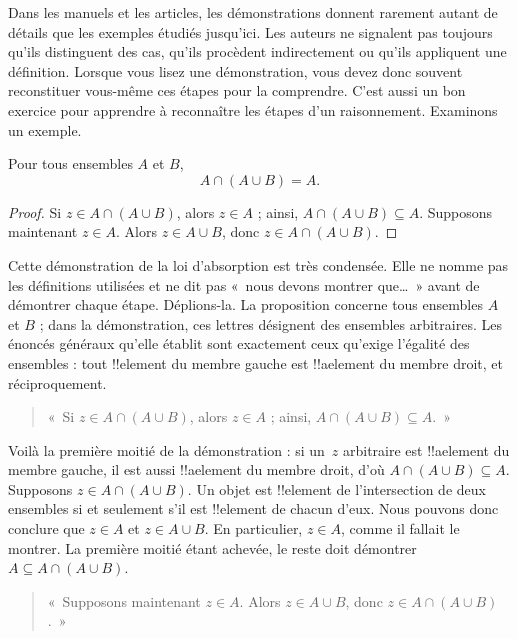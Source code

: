 \documentclass[../../../include/open-logic-section]{subfiles}
\begin{document}

Dans les manuels et les articles, les
démonstrations donnent rarement autant
de détails que les exemples étudiés
jusqu'ici. Les auteurs ne signalent
pas toujours qu'ils distinguent des
cas, qu'ils procèdent indirectement
ou qu'ils appliquent une définition.
Lorsque vous lisez une démonstration,
vous devez donc souvent reconstituer
vous-même ces étapes pour la comprendre.
C'est aussi un bon exercice pour apprendre à reconnaître les étapes
d'un raisonnement.
Examinons un exemple.

\begin{prop}[Absorption]
Pour tous ensembles $A$ et $B$,
\[
A \cap (A \cup B) = A.
\]
\end{prop}

\begin{proof}
Si $z \in A \cap (A \cup B)$,
alors $z \in A$ ; ainsi,
$A \cap (A \cup B) \subseteq A$.
Supposons maintenant $z \in A$.
Alors $z \in A \cup B$, donc
$z \in A \cap (A \cup B)$.
\end{proof}

Cette démonstration de la loi
d'absorption est très condensée.
Elle ne nomme pas les définitions
utilisées et ne dit pas «~nous
devons montrer que…~» avant de
démontrer chaque étape. Déplions-la.
La proposition concerne tous
ensembles $A$ et $B$ ; dans la
démonstration, ces lettres désignent
des ensembles arbitraires.
Les énoncés généraux qu'elle établit
sont exactement ceux qu'exige
l'égalité des ensembles : tout
!!{element} du membre gauche est
!!a{element} du membre droit,
et réciproquement.

\begin{quote}
«~Si $z \in A \cap (A \cup B)$,
alors $z \in A$ ; ainsi,
$A \cap (A \cup B) \subseteq A$.~»
\end{quote}

Voilà la première moitié de la
démonstration : si un~$z$ arbitraire
est !!a{element} du membre gauche,
il est aussi !!a{element} du membre
droit, d'où
$A \cap (A \cup B) \subseteq A$.
Supposons $z \in A \cap (A \cup B)$.
Un objet est !!{element} de
l'intersection de deux ensembles
si et seulement s'il est
!!{element} de chacun
d'eux. Nous pouvons donc conclure
que $z \in A$ et $z \in A \cup B$.
En particulier, $z \in A$,
comme il fallait le montrer.
La première moitié étant achevée,
le reste doit démontrer
$A \subseteq A \cap (A \cup B)$.

\begin{quote}
«~Supposons maintenant $z \in A$.
Alors $z \in A \cup B$, donc
$z \in A \cap (A \cup B)$.~»
\end{quote}
\end{document}
